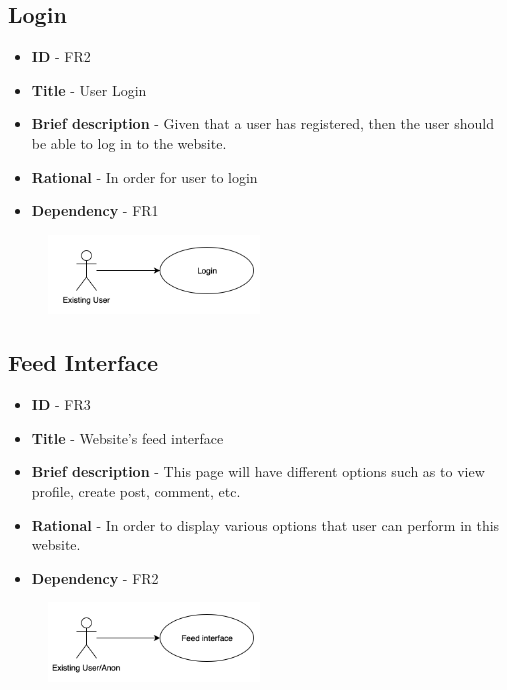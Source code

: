 \documentclass[12pt]{report}
\begin{document}
\subsection{Login}
\begin{itemize}
    \item \textbf{ID} - FR2
    \item \textbf{Title} - User Login
    \item \textbf{Brief description} - Given that a user has registered, then the user should be able to log in to the website.
    \item \textbf{Rational} - In order for user to login
    \item \textbf{Dependency} - FR1
\end{itemize}
\begin{figure}[h]
\includegraphics[width=0.5\textwidth]{login.png}
\end{figure}

\subsection{Feed Interface}
\begin{itemize}
    \item \textbf{ID} - FR3
    \item \textbf{Title} - Website's feed interface
    \item \textbf{Brief description} - This page will have different options such as to view profile, create post, comment, etc.
    \item \textbf{Rational} - In order to display various options that user can perform in this website.
    \item \textbf{Dependency} - FR2
\end{itemize}
\begin{figure}[h]
\includegraphics[width=0.5\textwidth]{feedinterface.png}
\end{figure}
\end{document}
